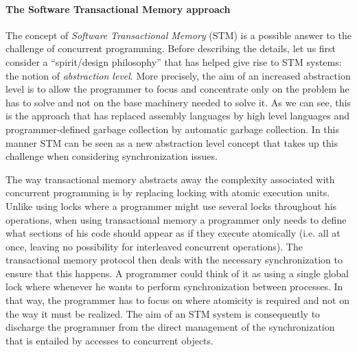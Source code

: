 

\paragraph{The Software Transactional Memory approach}
The concept of {\it Software Transactional  Memory}   (STM)  is  a possible answer  
to   the  challenge of concurrent programming.
Before describing the details, let us first consider a ``spirit/design philosophy'' that has helped give
rise to  STM systems: the notion of 
{\it abstraction level}.
More precisely,  the  aim of an increased abstraction level is   to allow  the programmer  to  focus and
concentrate only  on the problem  he has to
solve and not on the base machinery needed to solve it. 
As we can see, this is the approach  that  has   replaced assembly languages  
by  high level languages and programmer-defined garbage collection 
by automatic garbage collection.
In this manner STM can  be seen as a  new abstraction level concept
that takes  up  this challenge when considering synchronization issues.

The way transactional memory abstracts away the  complexity associated with 
concurrent programming is   by  replacing locking  with  atomic
execution units.
Unlike using locks where a programmer might use several locks
throughout his operations, when using transactional memory
a programmer only needs to define what sections of his code should
appear as if they execute atomically (i.e. all at once, leaving
no possibility for interleaved concurrent operations).
The transactional memory protocol then deals with the necessary
synchronization to ensure that this happens.
A programmer could think of it as using a single global lock
where whenever he wants to perform synchronization between processes.
In  that way, the programmer has to focus on  where 
atomicity is required and  not on the  way it must be realized. The aim of
an STM system is consequently  to  discharge the programmer from the direct 
management  of  the  synchronization  that  is entailed  by   accesses   to
concurrent  objects.  

